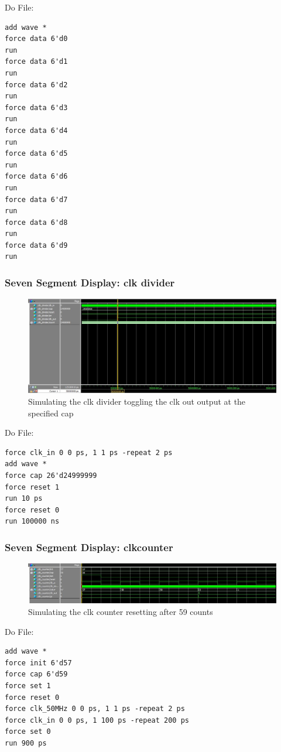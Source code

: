 \documentclass[a4paper]{article}
\begin{document}
Do File:
\begin{Verbatim}
add wave *
force data 6'd0
run
force data 6'd1
run
force data 6'd2
run
force data 6'd3
run
force data 6'd4
run
force data 6'd5
run
force data 6'd6
run
force data 6'd7
run
force data 6'd8
run
force data 6'd9
run

\end{Verbatim}

\subsubsection{Seven Segment Display: clk divider}
\begin{figure}[H]
    \includegraphics[width=0.8 \linewidth]{images/clkdividersim.jpg}
    \caption{Simulating the clk divider toggling the clk out output at the specified cap}
    \label{clkdividersim}
\end{figure}

Do File:
\begin{Verbatim}
force clk_in 0 0 ps, 1 1 ps -repeat 2 ps
add wave *
force cap 26'd24999999
force reset 1
run 10 ps
force reset 0
run 100000 ns

\end{Verbatim}

\subsubsection{Seven Segment Display: clkcounter}
\begin{figure}[H]
    \includegraphics[width=0.8 \linewidth]{images/clkcountersim.jpg}
    \caption{Simulating the clk counter resetting after 59 counts}
    \label{clkcountersim}
\end{figure}

Do File:
\begin{Verbatim}
add wave *
force init 6'd57
force cap 6'd59
force set 1
force reset 0
force clk_50MHz 0 0 ps, 1 1 ps -repeat 2 ps
force clk_in 0 0 ps, 1 100 ps -repeat 200 ps
force set 0
run 900 ps

\end{Verbatim}
\end{document}
